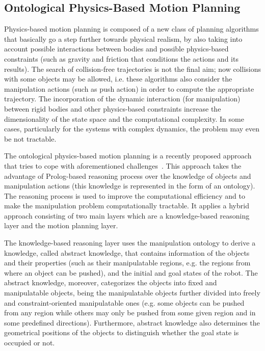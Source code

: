 \documentclass[runningheads,a4paper]{llncs}
\begin{document}
\subsection{Ontological Physics-Based Motion Planning}
Physics-based motion planning is composed of a new class of planning algorithms that basically go a step further towards physical realism, by also taking into account possible interactions between bodies and
possible physics-based constraints (such as gravity and friction that conditions the actions and its results).
The search of collision-free trajectories is not the final aim; now collisions with some objects may be allowed, i.e. these  algorithms also consider the manipulation actions (such as push action) in order
to compute the appropriate trajectory.
 The incorporation of the dynamic interaction (for manipulation) between rigid bodies and other physics-based constraints
 increase the dimensionality of the state space and the computational complexity. In some cases, particularly for the systems with
complex dynamics, the problem may even be not tractable.

The ontological physics-based motion planning is a recently proposed approach that tries to cope with aforementioned challenges~\cite{muhayyuddin2015}. This approach takes the advantage
of Prolog-based reasoning process over the knowledge  of objects and manipulation actions (this knowledge is represented in the form of an ontology).
The reasoning process is used to improve  the computational efficiency and to make the manipulation problem computationally tractable. It applies a hybrid approach consisting of two main layers which are
 a knowledge-based reasoning layer and the motion planning layer.


The knowledge-based reasoning layer uses the manipulation ontology to derive a knowledge, called abstract knowledge, that contains information of the objects and their properties (such as their manipulatable regions, e.g. the regions from where an object can be pushed),
 and the initial and goal
states of the robot. The abstract knowledge, moreover, categorizes the objects into fixed and manipulatable objects, being the manipulatable objects further divided
into freely and constraint-oriented manipulatable ones (e.g. some objects can be pushed from any region while others may only be pushed from some given region and in some predefined directions).
 Furthermore, abstract knowledge also determines the geometrical positions of the objects to distinguish
whether the goal state is occupied or not.
\end{document}
